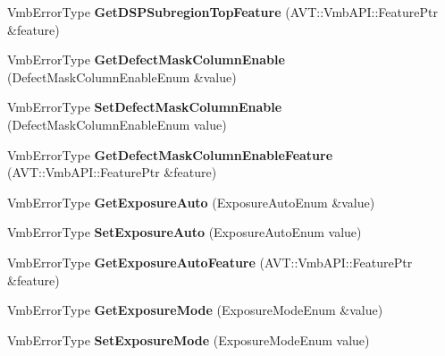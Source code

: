 \begin{DoxyCompactItemize}
\item 
\hypertarget{classMakoCamera_a738bc2f83785ab912b947464c9d006da}{Vmb\-Error\-Type {\bfseries Get\-D\-S\-P\-Subregion\-Top\-Feature} (A\-V\-T\-::\-Vmb\-A\-P\-I\-::\-Feature\-Ptr \&feature)}\label{classMakoCamera_a738bc2f83785ab912b947464c9d006da}

\item 
\hypertarget{classMakoCamera_a7de69325c9a7045dc3667e02a5eb49ab}{Vmb\-Error\-Type {\bfseries Get\-Defect\-Mask\-Column\-Enable} (Defect\-Mask\-Column\-Enable\-Enum \&value)}\label{classMakoCamera_a7de69325c9a7045dc3667e02a5eb49ab}

\item 
\hypertarget{classMakoCamera_ad4762a4dd50db285b2b20b965e6399d7}{Vmb\-Error\-Type {\bfseries Set\-Defect\-Mask\-Column\-Enable} (Defect\-Mask\-Column\-Enable\-Enum value)}\label{classMakoCamera_ad4762a4dd50db285b2b20b965e6399d7}

\item 
\hypertarget{classMakoCamera_a2b2947f77de4806f4a6c6b45ea7340a2}{Vmb\-Error\-Type {\bfseries Get\-Defect\-Mask\-Column\-Enable\-Feature} (A\-V\-T\-::\-Vmb\-A\-P\-I\-::\-Feature\-Ptr \&feature)}\label{classMakoCamera_a2b2947f77de4806f4a6c6b45ea7340a2}

\item 
\hypertarget{classMakoCamera_ab6f4baf030e4c2e3dd6f69293064d663}{Vmb\-Error\-Type {\bfseries Get\-Exposure\-Auto} (Exposure\-Auto\-Enum \&value)}\label{classMakoCamera_ab6f4baf030e4c2e3dd6f69293064d663}

\item 
\hypertarget{classMakoCamera_aff9d9569e27a02fd01384e765011e96e}{Vmb\-Error\-Type {\bfseries Set\-Exposure\-Auto} (Exposure\-Auto\-Enum value)}\label{classMakoCamera_aff9d9569e27a02fd01384e765011e96e}

\item 
\hypertarget{classMakoCamera_a20b1adb79283f26eb124ed1fe41fb420}{Vmb\-Error\-Type {\bfseries Get\-Exposure\-Auto\-Feature} (A\-V\-T\-::\-Vmb\-A\-P\-I\-::\-Feature\-Ptr \&feature)}\label{classMakoCamera_a20b1adb79283f26eb124ed1fe41fb420}

\item 
\hypertarget{classMakoCamera_a32212c10c38add68a253deac2e052ed5}{Vmb\-Error\-Type {\bfseries Get\-Exposure\-Mode} (Exposure\-Mode\-Enum \&value)}\label{classMakoCamera_a32212c10c38add68a253deac2e052ed5}

\item 
\hypertarget{classMakoCamera_a77eebc121e7be716ac24492d0eb0e1d4}{Vmb\-Error\-Type {\bfseries Set\-Exposure\-Mode} (Exposure\-Mode\-Enum value)}\label{classMakoCamera_a77eebc121e7be716ac24492d0eb0e1d4}


\end{DoxyCompactItemize}
